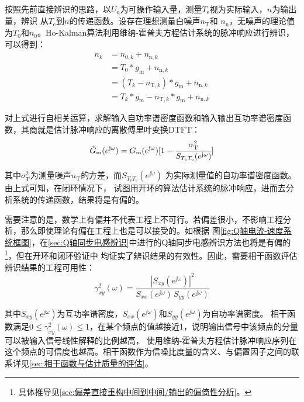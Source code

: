 按照先前直接辨识的思路，以\(U_{\mathrm{q}}\)为可操作输入量，测量\(T_{\mathrm{e}}\)视为实际输入，\(n\)为输出量，辨识
从\(T_{\mathrm{e}}\)到\(n\)的传递函数。设存在理想测量白噪声\(n_{\mathrm{T}}\)和
\(n_{\mathrm{n}}\)，无噪声的理论值为\(T_{0}\)和\(n_0\)。Ho-Kalman算法利用维纳-霍普夫方程估计系统的脉冲响应进行辨识，可以得到：
\begin{align*}
    n_k&=n_{0,k}+n_{\mathrm{n},k}\\
    &=T_0*g_{\mathrm{m}}+n_{\mathrm{n},k}\\
    &=(T_k-n_{\mathrm{T},k})*g_{\mathrm{m}}+n_{\mathrm{n},k}\\
    &=T_k*g_{\mathrm{m}}-n_{\mathrm{T},k}*g_{\mathrm{m}}+n_{\mathrm{n},k}
\end{align*}

对上式进行自相关运算，求解输入自功率谱密度函数和输入输出互功率谱密度函数，其商就是估计脉冲响应的离散傅里叶变换DTFT：
\begin{equation*}
    \hat{G}_{\mathrm{m}}(e^{\mathrm{j}\omega})=G_{\mathrm{m}}(e^{\mathrm{j}\omega})
    [1-\cfrac{\sigma_{\mathrm{T}}^2}{S_{T_{\mathrm{e}}T_{\mathrm{e}}}(e^{\mathrm{j}\omega})}]
\end{equation*}

其中\(\sigma_{\mathrm{T}}^2\)为测量噪声\(n_{\mathrm{T}}\)的方差，而\(S_{T_{\mathrm{e}}T_{\mathrm{e}}}(e^{\jj\omega})\)
为实际测量值的自功率谱密度函数。由上式可知，在闭环情况下，
试图用开环的算法估计系统的脉冲响应，进而去分析系统的传递函数，结果将是有偏的。

需要注意的是，数学上有偏并不代表工程上不可行。若偏差很小，不影响工程分析，那么即使理论有偏在工程上也是可以接受的。如根据
图\ref{fig:Q轴电流-速度系统框图}，在\ref{sec:Q轴同步电感辨识}中进行的Q轴同步电感辨识方法也将是有偏的
\footnote{具体推导见\ref{sec:偏差直接重构中间到中间/输出的偏倚性分析}。}，但在开环和闭环验证中
均证实了辨识结果的有效性。因此，需要相干函数评估辨识结果的工程可用性：
\begin{equation}
    \gamma_{xy}^2(\omega)=\frac{|S_{xy}(e^{\jj\omega})|^2}{S_{xx}(e^{\jj\omega})\,S_{yy}(e^{\jj\omega})}
    \label{eq:相干函数定义}
\end{equation}

其中\(S_{xy}(e^{\jj\omega})\)为互功率谱密度，\(S_{xx}(e^{\jj\omega})\)和\(S_{yy}(e^{\jj\omega})\)为自功率谱密度。
相干函数满足\(0\le \gamma_{xy}^2(\omega)\le 1\)，在某个频点的值越接近1，说明输出信号中该频点的分量可以被输入信号线性解释的比例越高，
使用维纳-霍普夫方程估计脉冲响应序列在这个频点的可信度也越高。相干函数作为信噪比度量的含义、与偏置因子之间的联系详见\ref{sec:相干函数与估计质量的评估}。

